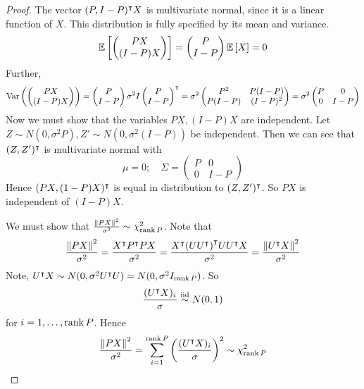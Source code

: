 \begin{proof}
	The vector \( (P, I-P)^\intercal X \) is multivariate normal, since it is a linear function of \( X \).
	This distribution is fully specified by its mean and variance.
	\[
		\mathbb{E}\left[{\begin{pmatrix}
				PX \\
				(I-P)X
			\end{pmatrix}}\right] = \begin{pmatrix}
			P \\
			I-P
		\end{pmatrix} \mathbb{E}\left[{X}\right] = 0
	\]
	Further,
	\[
		\operatorname{Var}\left({\begin{pmatrix}
				PX \\
				(I-P)X
			\end{pmatrix}}\right) = \begin{pmatrix}
			P \\
			I - P
		\end{pmatrix} \sigma^2 I \begin{pmatrix}
			P \\
			I - P
		\end{pmatrix}^\intercal = \sigma^2 \begin{pmatrix}
			P^2    & P(I-P)  \\
			P(I-P) & (I-P)^2
		\end{pmatrix} = \sigma^2 \begin{pmatrix}
			P & 0   \\
			0 & I-P
		\end{pmatrix}
	\]
	Now we must show that the variables \( PX, (I-P)X \) are independent.
	Let \( Z \sim N(0,\sigma^2 P), Z' \sim N(0,\sigma^2(I-P)) \) be independent.
	Then we can see that \( (Z, Z')^\intercal \) is multivariate normal with
	\[
		\mu = 0;\quad \Sigma = \begin{pmatrix}
			P & 0     \\
			0 & I - P
		\end{pmatrix}
	\]
	Hence \( (PX, (1-P)X)^\intercal \) is equal in distribution to \( (Z, Z')^\intercal \).
	So \( PX \) is independent of \( (I-P)X \).

	We must show that \( \frac{\norm{PX}^2}{\sigma^2} \sim \chi^2_{\rank P} \).
	Note that
	\[
		\frac{\norm{PX}^2}{\sigma^2} = \frac{X^\intercal P^\intercal P X}{\sigma^2} = \frac{X^\intercal \qty(U U^\intercal)^\intercal U U^\intercal X}{\sigma^2} = \frac{\norm{U^\intercal X}^2}{\sigma^2}
	\]
	Note, \( U^\intercal X \sim N(0,\sigma^2 U^\intercal U) = N(0,\sigma^2 I_{\rank P}) \).
	So
	\[
		\frac{(U^\intercal X)_i}{\sigma} \overset{\text{iid}}{\sim} N(0,1)
	\]
	for \( i = 1, \dots, \rank P \).
	Hence
	\[
		\frac{\norm{PX}^2}{\sigma^2} = \sum_{i=1}^{\rank P} \qty(\frac{(U^\intercal X)_i}{\sigma})^2 \sim \chi^2_{\rank P}
	\]
\end{proof}
